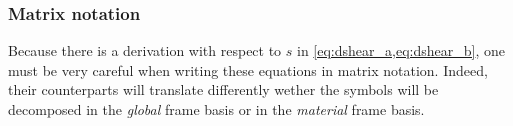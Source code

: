
\subsubsection{Matrix notation}
Because there is a derivation with respect to $s$ in \cref{eq:dshear_a,eq:dshear_b}, one must be very careful when writing these equations in matrix notation. Indeed, their counterparts will translate differently wether the symbols will be decomposed in the \emph{global} frame basis or in the \emph{material} frame basis.

